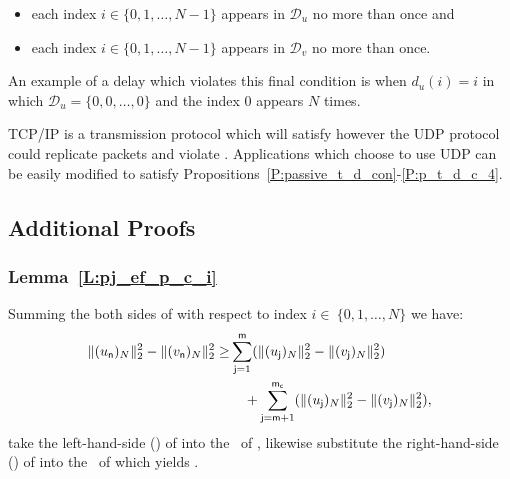 \begin{proposition}
\begin{enumerate}[I.]
\begin{itemize}
\item each index $i \in \{0,1,\dots,N-1\}$ appears in $\mathcal{D}_u$ no more than once and
\item each index $i \in \{0,1,\dots,N-1\}$ appears in $\mathcal{D}_v$ no more than once.
\end{itemize}
An example of a delay which violates this final condition is when $d_u(i)=i$ in which $\mathcal{D}_u=\{0,0,\dots,0\}$ and the index $0$ appears $N$ times.
\end{enumerate}
\end{proposition}
 TCP/IP is a transmission protocol which will satisfy  however the UDP protocol could replicate packets and violate .  Applications which choose to use UDP can be easily modified to satisfy Propositions~\ref{P:passive_t_d_con}-\ref{P:p_t_d_c_4}.
\subsection{Additional Proofs}
\subsubsection{Lemma~\ref{L:pj_ef_p_c_i}}
\label{S:pj_ef_p_c_i}
\begin{IEEEproof}
Summing the both sides of  with respect
to index $i \in\ \{0,1,\dots,N\}$ we have:
\begin{equation}
\label{E:pj_eq_1}
\begin{split}
\|(u_{\mathsf{n}})_N\|_{2}^2-\|(v_{\mathsf{n}})_N\|_{2}^2 \geq&
\sum_{\mathsf{j}=1}^{\mathsf{m}}(\|(u_{\mathsf{j}})_N\|_{2}^2-\|(v_{\mathsf{j}})_N\|_{2}^2)\\
& \quad + \sum_{\mathsf{j}=\mathsf{m} +1}^{\mathsf{m_c}}
(\|(u_{\mathsf{j}})_N\|_{2}^2-\|(v_{\mathsf{j}})_N\|_{2}^2), 
\end{split}
\end{equation}
take the left-hand-side (\LHS) of  into the \LHS\ of
, likewise substitute the right-hand-side (\RHS) of
 into the \RHS\ of  which yields
.
\end{IEEEproof}
